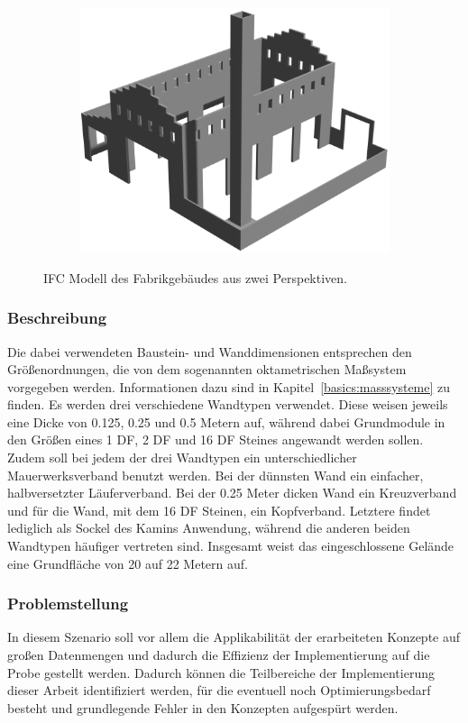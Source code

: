 \begin{figure}[hb!]
\begin{subfigure}[b]{0.49\columnwidth}
    \includegraphics[width=\columnwidth]{fig/scenario3_render_ifc2.png}
  \end{subfigure}
  \caption{IFC Modell des Fabrikgebäudes aus zwei Perspektiven.}\label{fig:scenarios:Scenario3 Gebaeudeplan}
\end{figure}

\subsubsection*{Beschreibung}
Die dabei verwendeten Baustein- und Wanddimensionen entsprechen den Größenordnungen, die von dem sogenannten oktametrischen Maßsystem vorgegeben werden.
Informationen dazu sind in Kapitel~\ref{basics:masssysteme} zu finden.
Es werden drei verschiedene Wandtypen verwendet.
Diese weisen jeweils eine Dicke von 0.125, 0.25 und 0.5 Metern auf, während dabei Grundmodule in den Größen eines 1 DF, 2 DF und 16 DF Steines angewandt werden sollen.
Zudem soll bei jedem der drei Wandtypen ein unterschiedlicher Mauerwerksverband benutzt werden.
Bei der dünnsten Wand ein einfacher, halbversetzter Läuferverband.
Bei der 0.25 Meter dicken Wand ein Kreuzverband und für die Wand, mit dem 16 DF Steinen, ein Kopfverband.
Letztere findet lediglich als Sockel des Kamins Anwendung, während die anderen beiden Wandtypen häufiger vertreten sind.
Insgesamt weist das eingeschlossene Gelände eine Grundfläche von 20 auf 22 Metern auf.

\subsubsection*{Problemstellung}
In diesem Szenario soll vor allem die Applikabilität der erarbeiteten Konzepte auf großen Datenmengen und dadurch die Effizienz der Implementierung auf die Probe gestellt werden.
Dadurch können die Teilbereiche der Implementierung dieser Arbeit identifiziert werden, für die eventuell noch Optimierungsbedarf besteht und grundlegende Fehler in den Konzepten aufgespürt werden.

